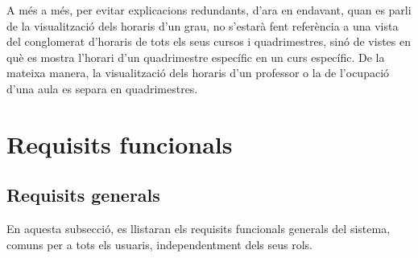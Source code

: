 \documentclass[a4paper,12pt]{ThesisStyle}
\begin{document}

A més a més, per evitar explicacions redundants, d'ara en endavant, quan es parli de la visualització dels horaris d'un grau, no s'estarà fent referència a una vista del conglomerat d'horaris de tots els seus cursos i quadrimestres, sinó de vistes en què es mostra l'horari d'un quadrimestre específic en un curs específic. De la mateixa manera, la visualització dels horaris d'un professor o la de l'ocupació d'una aula es separa en quadrimestres.

\section{Requisits funcionals}
\label{sec:requisits_funcionals}

\subsection{Requisits generals}
\label{subsec:requisits_generals} %

En aquesta subsecció, es llistaran els requisits funcionals generals del sistema, comuns per a tots els usuaris, independentment dels seus rols.
\end{document}
